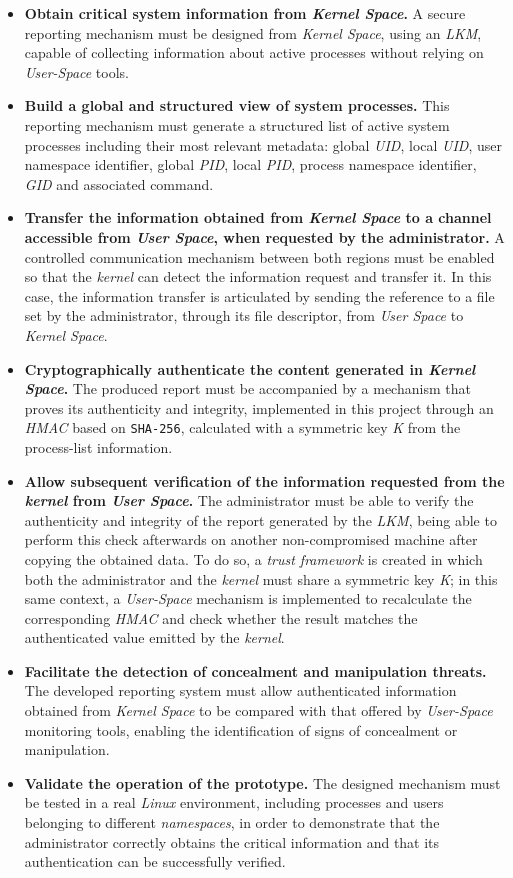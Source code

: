 \begin{itemize}
    \item \textbf{Obtain critical system information from \textit{Kernel Space}.} A secure reporting mechanism must be designed from \textit{Kernel Space}, using an \textit{LKM}, capable of collecting information about active processes without relying on \textit{User-Space} tools.
    \item \textbf{Build a global and structured view of system processes.} This reporting mechanism must generate a structured list of active system processes including their most relevant metadata: global \textit{UID}, local \textit{UID}, user namespace identifier, global \textit{PID}, local \textit{PID}, process namespace identifier, \textit{GID} and associated command.
    \item \textbf{Transfer the information obtained from \textit{Kernel Space} to a channel accessible from \textit{User Space}, when requested by the administrator.} A controlled communication mechanism between both regions must be enabled so that the \textit{kernel} can detect the information request and transfer it. In this case, the information transfer is articulated by sending the reference to a file set by the administrator, through its file descriptor, from \textit{User Space} to \textit{Kernel Space}.
    \item \textbf{Cryptographically authenticate the content generated in \textit{Kernel Space}.} The produced report must be accompanied by a mechanism that proves its authenticity and integrity, implemented in this project through an \textit{HMAC} based on \texttt{SHA-256}, calculated with a symmetric key \textit{K} from the process-list information.
    \item \textbf{Allow subsequent verification of the information requested from the \textit{kernel} from \textit{User Space}.} The administrator must be able to verify the authenticity and integrity of the report generated by the \textit{LKM}, being able to perform this check afterwards on another non-compromised machine after copying the obtained data. To do so, a \textit{trust framework} is created in which both the administrator and the \textit{kernel} must share a symmetric key \textit{K}; in this same context, a \textit{User-Space} mechanism is implemented to recalculate the corresponding \textit{HMAC} and check whether the result matches the authenticated value emitted by the \textit{kernel}.
    \item \textbf{Facilitate the detection of concealment and manipulation threats.} The developed reporting system must allow authenticated information obtained from \textit{Kernel Space} to be compared with that offered by \textit{User-Space} monitoring tools, enabling the identification of signs of concealment or manipulation.
    \item \textbf{Validate the operation of the prototype.} The designed mechanism must be tested in a real \textit{Linux} environment, including processes and users belonging to different \textit{namespaces}, in order to demonstrate that the administrator correctly obtains the critical information and that its authentication can be successfully verified.
\end{itemize}

